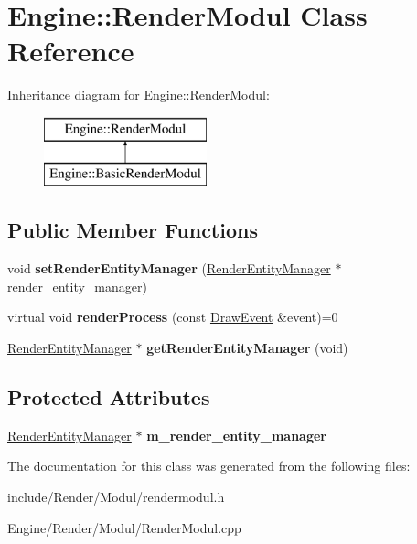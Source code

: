 \hypertarget{classEngine_1_1RenderModul}{}\section{Engine\+:\+:Render\+Modul Class Reference}
\label{classEngine_1_1RenderModul}
Inheritance diagram for Engine\+:\+:Render\+Modul\+:\begin{figure}[H]
\begin{center}
\leavevmode
\includegraphics[height=2.000000cm]{classEngine_1_1RenderModul}
\end{center}
\end{figure}
\subsection*{Public Member Functions}
\begin{DoxyCompactItemize}
\item 
\hypertarget{classEngine_1_1RenderModul_a8e5e32ea29a067c49d7d855e589a7756}{}void {\bfseries set\+Render\+Entity\+Manager} (\hyperlink{classEngine_1_1RenderEntityManager}{Render\+Entity\+Manager} $\ast$render\+\_\+entity\+\_\+manager)\label{classEngine_1_1RenderModul_a8e5e32ea29a067c49d7d855e589a7756}

\item 
\hypertarget{classEngine_1_1RenderModul_ab943c038ae188d3d69af12a71525edef}{}virtual void {\bfseries render\+Process} (const \hyperlink{classEngine_1_1DrawEvent}{Draw\+Event} \&event)=0\label{classEngine_1_1RenderModul_ab943c038ae188d3d69af12a71525edef}

\item 
\hypertarget{classEngine_1_1RenderModul_a986b94ac3e33e30d470b425069644f42}{}\hyperlink{classEngine_1_1RenderEntityManager}{Render\+Entity\+Manager} $\ast$ {\bfseries get\+Render\+Entity\+Manager} (void)\label{classEngine_1_1RenderModul_a986b94ac3e33e30d470b425069644f42}

\end{DoxyCompactItemize}
\subsection*{Protected Attributes}
\begin{DoxyCompactItemize}
\item 
\hypertarget{classEngine_1_1RenderModul_aa471dc28208c160d1481980b0ab15b7e}{}\hyperlink{classEngine_1_1RenderEntityManager}{Render\+Entity\+Manager} $\ast$ {\bfseries m\+\_\+render\+\_\+entity\+\_\+manager}\label{classEngine_1_1RenderModul_aa471dc28208c160d1481980b0ab15b7e}

\end{DoxyCompactItemize}


The documentation for this class was generated from the following files\+:\begin{DoxyCompactItemize}
\item 
include/\+Render/\+Modul/rendermodul.\+h\item 
Engine/\+Render/\+Modul/Render\+Modul.\+cpp\end{DoxyCompactItemize}
